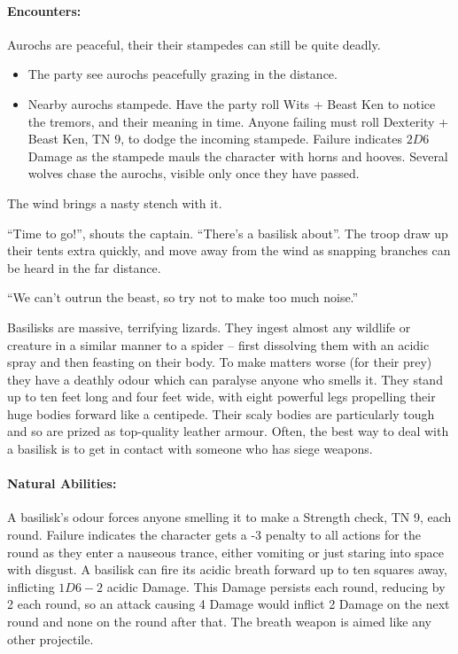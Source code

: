 \begin{multicols}{2}
\begin{boxtext}
\end{boxtext}

\paragraph{Encounters:} Aurochs are peaceful, their their stampedes can still be quite deadly.

\begin{itemize}

	\item
	The party see aurochs peacefully grazing in the distance.
	\item
	Nearby aurochs stampede.
	Have the party roll Wits + Beast Ken to notice the tremors, and their meaning in time.
	Anyone failing must roll Dexterity + Beast Ken, TN 9, to dodge the incoming stampede.
	Failure indicates $2D6$ Damage as the stampede mauls the character with horns and hooves.
	Several wolves chase the aurochs, visible only once they have passed.

\end{itemize}

\label{basilisk}
\basilisk

\begin{boxtext}

	The wind brings a nasty stench with it.

	``Time to go!'', shouts the captain.
	``There's a basilisk about''.
	The troop draw up their tents extra quickly, and move away from the wind as snapping branches can be heard in the far distance.

	``We can't outrun the beast, so try not to make too much noise.''

\end{boxtext}

Basilisks are massive, terrifying lizards.
They ingest almost any wildlife or creature in a similar manner to a spider -- first dissolving them with an acidic spray and then feasting on their body.
To make matters worse (for their prey) they have a deathly odour which can paralyse anyone who smells it.
They stand up to ten feet long and four feet wide, with eight powerful legs propelling their huge bodies forward like a centipede.
Their scaly bodies are particularly tough and so are prized as top-quality leather armour.
Often, the best way to deal with a basilisk is to get in contact with someone who has siege weapons.

\paragraph{Natural Abilities:} A basilisk's odour forces anyone smelling it to make a Strength check, TN 9, each round.
Failure indicates the character gets a -3 penalty to all actions for the round as they enter a nauseous trance, either vomiting or just staring into space with disgust.
A basilisk can fire its acidic breath forward up to ten squares away, inflicting $1D6-2$ acidic Damage.
This Damage persists each round, reducing by 2  each round, so an attack causing 4 Damage would inflict 2  Damage on the next round and none on the round after that.
The breath weapon is aimed like any other projectile.


\end{multicols}
